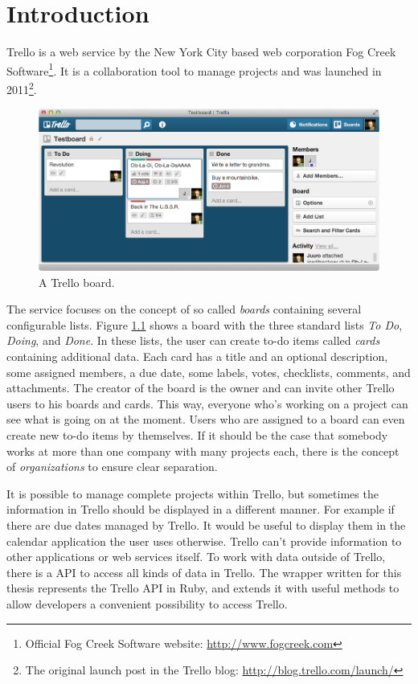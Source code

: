 \onehalfspacing
\chapter{Introduction}
\label{Introduction}
Trello is a web service by the New York City based web corporation Fog Creek Software\footnote{Official Fog Creek Software website: \url{http://www.fogcreek.com}}. It is a collaboration tool to manage projects and was launched in 2011\footnote{The original launch post in the Trello blog: \url{http://blog.trello.com/launch/}}. 

\begin{figure}[htb]
\centering
\includegraphics[width=\textwidth]{figures/trello}
\caption{A Trello board.}
\label{fig:trello}
\end{figure}

The service focuses on the concept of so called \emph{boards} containing several configurable lists. Figure \ref{fig:trello} shows a board with the three standard lists \emph{To Do}, \emph{Doing}, and \emph{Done}. In these lists, the user can create to-do items called \emph{cards} containing additional data. Each card has a title and an optional description, some assigned members, a due date, some labels, votes, checklists, comments, and attachments. The creator of the board is the owner and can invite other Trello users to his boards and cards. This way, everyone who's working on a project can see what is going on at the moment. Users who are assigned to a board can even create new to-do items by themselves. If it should be the case that somebody works at more than one company with many projects each, there is the concept of \emph{organizations} to ensure clear separation.

It is possible to manage complete projects within Trello, but sometimes the information in Trello should be displayed in a different manner. For example if there are due dates managed by Trello. It would be useful to display them in the calendar application the user uses otherwise. Trello can't provide information to other applications or web services itself. To work with data outside of Trello, there is a API to access all kinds of data in Trello. The wrapper written for this thesis represents the Trello API in Ruby, and extends it with useful methods to allow developers a convenient possibility to access Trello.

